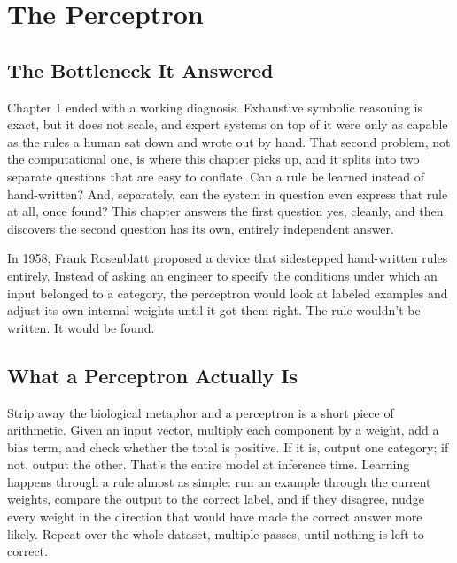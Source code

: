 \chapter{The Perceptron}

\section*{The Bottleneck It Answered}

Chapter 1 ended with a working diagnosis. Exhaustive symbolic reasoning is exact, but it does not scale, and expert systems on top of it were only as capable as the rules a human sat down and wrote out by hand. That second problem, not the computational one, is where this chapter picks up, and it splits into two separate questions that are easy to conflate. Can a rule be learned instead of hand-written? And, separately, can the system in question even express that rule at all, once found? This chapter answers the first question yes, cleanly, and then discovers the second question has its own, entirely independent answer.

In 1958, Frank Rosenblatt proposed a device that sidestepped hand-written rules entirely. Instead of asking an engineer to specify the conditions under which an input belonged to a category, the perceptron would look at labeled examples and adjust its own internal weights until it got them right. The rule wouldn't be written. It would be found.

\section*{What a Perceptron Actually Is}

Strip away the biological metaphor and a perceptron is a short piece of arithmetic. Given an input vector, multiply each component by a weight, add a bias term, and check whether the total is positive. If it is, output one category; if not, output the other. That's the entire model at inference time. Learning happens through a rule almost as simple: run an example through the current weights, compare the output to the correct label, and if they disagree, nudge every weight in the direction that would have made the correct answer more likely. Repeat over the whole dataset, multiple passes, until nothing is left to correct.

